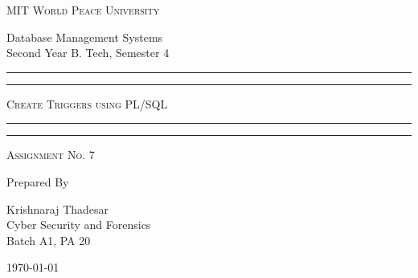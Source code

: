 \documentclass[11pt]{article}
\begin{document}
\begin{titlepage}
    \centering


    \huge\textsc{
        MIT World Peace University
    }\\

    \vspace{0.75\baselineskip} %

    \LARGE{
        Database Management Systems\\
        Second Year B. Tech, Semester 4
    }

    \vfill %


    \rule{\textwidth}{1.6pt}\vspace*{-\baselineskip}\vspace*{2pt}
    \rule{\textwidth}{0.6pt}
    \vspace{0.75\baselineskip} %



    \huge{\textsc{
            Create Triggers using PL/SQL
        }} \\



    \vspace{0.5\baselineskip} %
    \rule{\textwidth}{0.6pt}\vspace*{-\baselineskip}\vspace*{2.8pt}
    \rule{\textwidth}{1.6pt}

    \vspace{1\baselineskip} %


    \LARGE\textsc{
        Assignment No. 7
    } %
    \vfill


    Prepared By
    \vspace{0.5\baselineskip} %

    \Large{
        Krishnaraj Thadesar \\
        Cyber Security and Forensics\\
        Batch A1, PA 20
    }


    \vspace{0.5\baselineskip} %
    \today

\end{titlepage}
\end{document}
